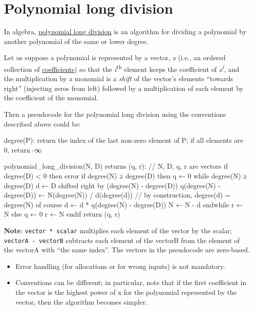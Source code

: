 \pagebreak{}
\section*{Polynomial long division}

In algebra,
\href{http://en.wikipedia.org/wiki/Polynomial\_long\_division}{polynomial
  long division} is an algorithm for dividing a polynomial by another
polynomial of the same or lower degree.

Let us suppose a polynomial is represented by a vector, \emph{x} (i.e.,
an ordered collection of
\href{http://en.wikipedia.org/wiki/Coefficient}{coefficients}) so that
the \emph{i}\textsuperscript{th} element keeps the coefficient of
\emph{x}\textsuperscript{\emph{i}}, and the multiplication by a monomial
is a \emph{shift} of the vector's elements ``towards right'' (injecting
zeros from left) followed by a multiplication of each element by the
coefficient of the monomial.

Then a pseudocode for the polynomial long division using the conventions
described above could be:

\begin{wideverbatim}
degree(P):
  return the index of the last non-zero element of P;
         if all elements are 0, return -∞

polynomial_long_division(N, D) returns (q, r):
  // N, D, q, r are vectors
  if degree(D) < 0 then error
  if degree(N) ≥ degree(D) then
    q ← 0
    while degree(N) ≥ degree(D)
      d ← D shifted right by (degree(N) - degree(D))
      q(degree(N) - degree(D)) ← N(degree(N)) / d(degree(d))
      // by construction, degree(d) = degree(N) of course
      d ← d * q(degree(N) - degree(D))
      N ← N - d
    endwhile
    r ← N
  else
    q ← 0
    r ← N
  endif
  return (q, r)
\end{wideverbatim}

\pagebreak{}

\textbf{Note}: \texttt{vector * scalar} multiplies each element of the
vector by the scalar; \texttt{vectorA - vectorB} subtracts each element
of the vectorB from the element of the vectorA with ``the same index''.
The vectors in the pseudocode are zero-based.

\begin{itemize}
\item
  Error handling (for allocations or for wrong inputs) is not mandatory.
\item
  Conventions can be different; in particular, note that if the first
  coefficient in the vector is the highest power of x for the polynomial
  represented by the vector, then the algorithm becomes simpler.
\end{itemize}

